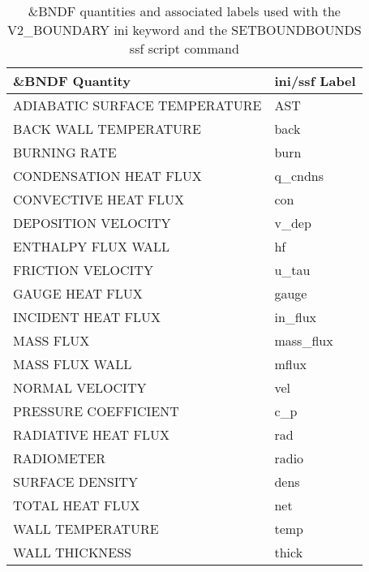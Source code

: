 \begin{table}[bph]
\begin{center}
\caption{\&BNDF quantities and associated labels used with the V2\_BOUNDARY ini keyword and the SETBOUNDBOUNDS ssf script command}
\vspace{0.1in}
\begin{tabular}{|l|l|}
\hline
\&BNDF Quantity & ini/ssf Label \\ \hline
 ADIABATIC SURFACE TEMPERATURE  &   AST \\ \hline
 BACK WALL TEMPERATURE  &   back \\ \hline
 BURNING RATE  &   burn \\ \hline
 CONDENSATION HEAT FLUX  &   q\_cndns \\ \hline
 CONVECTIVE HEAT FLUX  &   con \\ \hline
 DEPOSITION VELOCITY  &   v\_dep \\ \hline
 ENTHALPY FLUX WALL  &   hf \\ \hline
 FRICTION VELOCITY  &   u\_tau \\ \hline
 GAUGE HEAT FLUX  &   gauge \\ \hline
 INCIDENT HEAT FLUX  &   in\_flux \\ \hline
 MASS FLUX  &   mass\_flux \\ \hline
 MASS FLUX WALL  &   mflux \\ \hline
 NORMAL VELOCITY  &   vel \\ \hline
 PRESSURE COEFFICIENT  &   c\_p \\ \hline
 RADIATIVE HEAT FLUX  &   rad \\ \hline
 RADIOMETER  &   radio \\ \hline
 SURFACE DENSITY  &   dens \\ \hline
 TOTAL HEAT FLUX  &   net \\ \hline
 WALL TEMPERATURE  &   temp \\ \hline
 WALL THICKNESS  &   thick \\ \hline
\end{tabular}
\label{tabBNDF}
\end{center}
\end{table}
